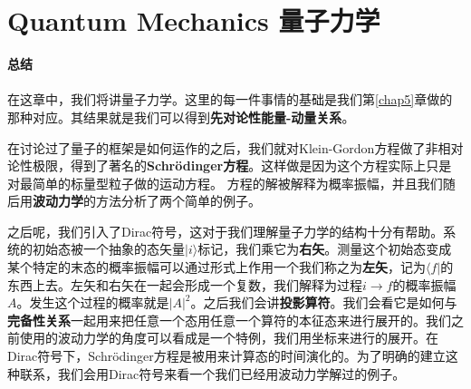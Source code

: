 

\def\pmm{\begin{pmatrix}}
\def\pmme{\end{pmatrix}}

\chapter[量子力学]{Quantum Mechanics 量子力学}\label{chap8}

{\Huge\bf 总结\\ \ \\}
在这章中，我们将讲量子力学。这里的每一件事情的基础是我们第\ref{chap5}章做的那种对应。其结果就是我们可以得到{\bf 先对论性能量-动量关系}。

在讨论过了量子的框架是如何运作的之后，我们就对Klein-Gordon方程做了非相对论性极限，得到了著名的{\bf Schrödinger方程}。这样做是因为这个方程实际上只是对最简单的标量型粒子做的运动方程。
方程的解被解释为概率振幅，并且我们随后用{\bf 波动力学}的方法分析了两个简单的例子。

之后呢，我们引入了{Dirac符号}，这对于我们理解量子力学的结构十分有帮助。系统的初始态被一个抽象的态矢量$|i\rangle$标记，我们乘它为{\bf 右矢}。测量这个初始态变成某个特定的末态的概率振幅可以通过形式上作用一个我们称之为{\bf 左矢}，记为$\langle f|$的东西上去。左矢和右矢在一起会形成一个复数，我们解释为过程$i\to f$的概率振幅$A$。发生这个过程的概率就是$|A|^2$。之后我们会讲{\bf 投影算符}。我们会看它是如何与{\bf 完备性关系}一起用来把任意一个态用任意一个算符的本征态来进行展开的。我们之前使用的波动力学的角度可以看成是一个特例，我们用坐标来进行的展开。在Dirac符号下，Schrödinger方程是被用来计算态的时间演化的。为了明确的建立这种联系，我们会用Dirac符号来看一个我们已经用波动力学解过的例子。

